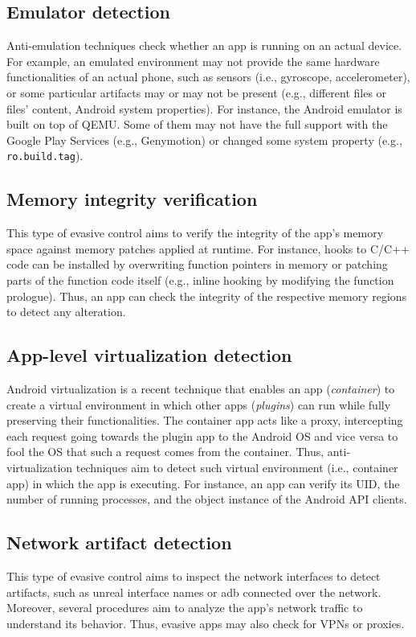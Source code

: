 \subsection{Emulator detection}
Anti-emulation techniques check whether an app is running on an actual device.
For example, an emulated environment may not provide the same hardware functionalities of an actual phone, such as sensors (i.e., gyroscope, accelerometer), or some particular artifacts may or may not be present (e.g., different files or files' content, Android system properties).
For instance, the Android emulator is built on top of QEMU.
Some of them may not have the full support with the Google Play Services (e.g., Genymotion) or changed some system property (e.g., \texttt{ro.build.tag}).

\subsection{Memory integrity verification}
This type of evasive control aims to verify the integrity of the app's memory space against memory patches applied at runtime. 
For instance, hooks to C/C++ code can be installed by overwriting function pointers in memory or patching parts of the function code itself (e.g., inline hooking by modifying the function prologue). Thus, an app can check the integrity of the respective memory regions to detect any alteration.

\subsection{App-level virtualization detection}
Android virtualization is a recent technique that enables an app (\textit{container}) to create a virtual environment in which other apps (\textit{plugins}) can run while fully preserving their functionalities.
The container app acts like a proxy, intercepting each request going towards the plugin app to the Android OS and vice versa to fool the OS that such a request comes from the container.
Thus, anti-virtualization techniques aim to detect such virtual environment (i.e., container app) in which the app is executing. 
For instance, an app can verify its UID, the number of running processes, and the object instance of the Android API clients.

\subsection{Network artifact detection}
This type of evasive control aims to inspect the network interfaces to detect artifacts, such as unreal interface names or adb connected over the network.
Moreover, several procedures aim to analyze the app's network traffic to understand its behavior.
Thus, evasive apps may also check for VPNs or proxies.


